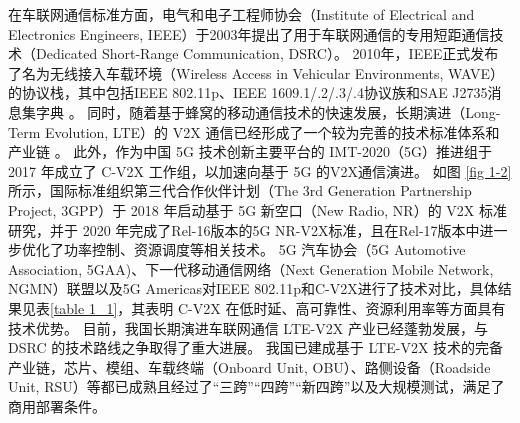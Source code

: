 在车联网通信标准方面，电气和电子工程师协会（Institute of Electrical and Electronics Engineers, IEEE）于2003年提出了用于车联网通信的专用短距通信技术（Dedicated Short-Range Communication, DSRC）。
2010年，IEEE正式发布了名为无线接入车载环境（Wireless Access in Vehicular Environments, WAVE）的协议栈，其中包括IEEE 802.11p、IEEE 1609.1/.2/.3/.4协议族和SAE J2735消息集字典 \cite{wu2013vehicular}。
同时，随着基于蜂窝的移动通信技术的快速发展，长期演进（Long-Term Evolution, LTE）的 V2X 通信已经形成了一个较为完善的技术标准体系和产业链 \cite{chen2016lte}。
此外，作为中国 5G 技术创新主要平台的 IMT-2020（5G）推进组于 2017 年成立了 C-V2X 工作组，以加速向基于 5G 的V2X通信演进。
如图 \ref{fig 1-2} 所示，国际标准组织第三代合作伙伴计划（The 3rd Generation Partnership Project, 3GPP）于 2018 年启动基于 5G 新空口（New Radio, NR）的 V2X 标准研究，并于 2020 年完成了Rel-16版本的5G NR-V2X标准\cite{saad2021advancements}，且在Rel-17版本中进一步优化了功率控制、资源调度等相关技术。
5G 汽车协会（5G Automotive Association, 5GAA)、下一代移动通信网络（Next Generation Mobile Network, NGMN）联盟以及5G Americas对IEEE 802.11p和C-V2X进行了技术对比，具体结果见表\ref{table 1_1}，其表明 C-V2X 在低时延、高可靠性、资源利用率等方面具有技术优势。
目前，我国长期演进车联网通信 LTE-V2X 产业已经蓬勃发展，与 DSRC 的技术路线之争取得了重大进展。
我国已建成基于 LTE-V2X 技术的完备产业链，芯片、模组、车载终端（Onboard Unit, OBU）、路侧设备（Roadside Unit, RSU）等都已成熟且经过了“三跨”“四跨”“新四跨”以及大规模测试，满足了商用部署条件。

